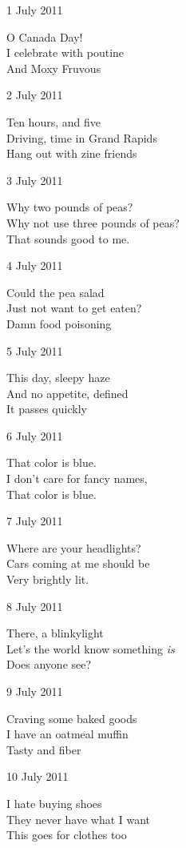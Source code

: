 \documentclass[12pt]{article}
\begin{document}
\vfill


1 July 2011

O Canada Day! \\
I celebrate with poutine \\
And Moxy Fruvous

\newpage

2 July 2011

Ten hours, and five \\
Driving, time in Grand Rapids \\
Hang out with zine friends

3 July 2011

Why two pounds of peas? \\
Why not use three pounds of peas? \\
That sounds good to me.

4 July 2011

Could the pea salad \\
Just not want to get eaten? \\
Damn food poisoning

5 July 2011

This day, sleepy haze \\
And no appetite, defined \\
It passes quickly

6 July 2011

That color is blue. \\
I don't care for fancy names, \\
That color is blue.

7 July 2011

Where are your headlights? \\
Cars coming at me should be \\
Very brightly lit.

8 July 2011

There, a blinkylight \\
Let's the world know something {\em is} \\
Does anyone see?

\newpage

9 July 2011

Craving some baked goods \\
I have an oatmeal muffin \\
Tasty and fiber

10 July 2011

I hate buying shoes \\
They never have what I want \\
This goes for clothes too
\end{document}
